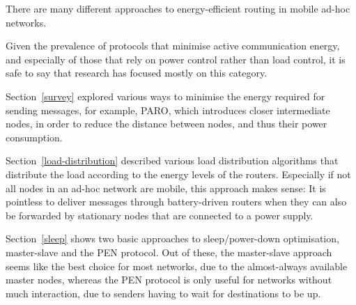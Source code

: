 There are many different approaches to energy-efficient routing in
mobile ad-hoc networks.

Given the prevalence of protocols that minimise active communication energy,
and especially of those that rely on power control rather than load control, it
is safe to say that research has focused mostly on this category.

Section~\ref{survey} explored various ways to minimise the energy required for sending
messages, for example, PARO, which introduces closer intermediate nodes,
in order to reduce the distance between nodes, and thus their
power consumption.

Section~\ref{load-distribution} described various load distribution algorithms that distribute
the load according to the energy levels of the routers. Especially if not all
nodes in an ad-hoc network are mobile, this approach makes sense: It is
pointless to deliver messages through battery-driven routers when they can
also be forwarded by stationary nodes that are connected to a power supply.

Section~\ref{sleep} shows two basic approaches to sleep/power-down optimisation, master-slave
and the PEN protocol. Out of these, the master-slave approach seems like the
best choice for most networks, due to the almost-always available master nodes,
whereas the PEN protocol is only useful for networks without much interaction,
due to senders having to wait for destinations to be up.
